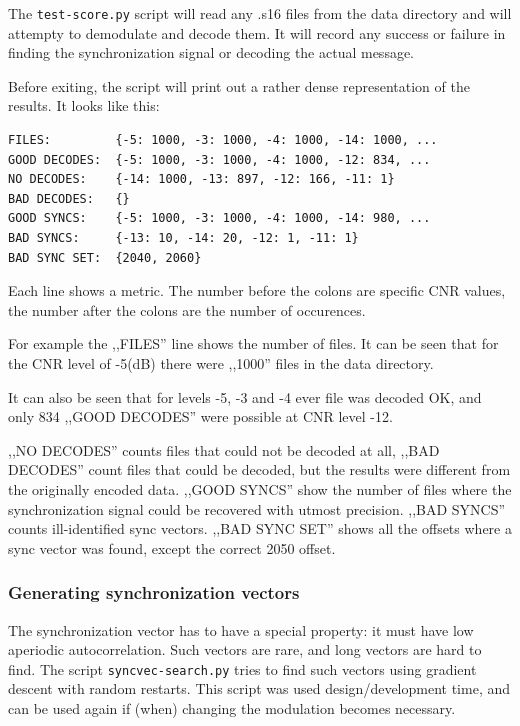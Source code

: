 \documentclass[a4paper]{article}
\begin{document}
The \texttt{test-score.py} script will read any .s16 files from the 
data directory and will attempty to demodulate and decode them. It will 
record any success or failure in finding the synchronization signal or 
decoding the actual message.

Before exiting, the script will print out a rather dense representation 
of the results. It looks like this:

\begin{lstlisting}
FILES:         {-5: 1000, -3: 1000, -4: 1000, -14: 1000, ...
GOOD DECODES:  {-5: 1000, -3: 1000, -4: 1000, -12: 834, ...
NO DECODES:    {-14: 1000, -13: 897, -12: 166, -11: 1}
BAD DECODES:   {}
GOOD SYNCS:    {-5: 1000, -3: 1000, -4: 1000, -14: 980, ...
BAD SYNCS:     {-13: 10, -14: 20, -12: 1, -11: 1}
BAD SYNC SET:  {2040, 2060}
\end{lstlisting}

Each line shows a metric. The number before the colons are specific CNR 
values, the number after the colons are the number of occurences.

For example the ,,FILES'' line shows the number of files. It can be 
seen that for the CNR level of -5(dB) there were ,,1000'' files in the 
data directory.

It can also be seen that for levels -5, -3 and -4 ever file was decoded 
OK, and only 834 ,,GOOD DECODES'' were possible at CNR level -12.

,,NO DECODES'' counts files that could not be decoded at all, ,,BAD 
DECODES'' count files that could be decoded, but the results were 
different from the originally encoded data. ,,GOOD SYNCS'' show the 
number of files where the synchronization signal could be recovered 
with utmost precision. ,,BAD SYNCS'' counts ill-identified sync 
vectors. ,,BAD SYNC SET'' shows all the offsets where a sync vector was 
found, except the correct 2050 offset.

\subsubsection{Generating synchronization vectors}

The synchronization vector has to have a special property: it must have 
low aperiodic autocorrelation. Such vectors are rare, and long vectors 
are hard to find. The script \texttt{syncvec-search.py} tries to find 
such vectors using gradient descent with random restarts. This script 
was used design/development time, and can be used again if (when) 
changing the modulation becomes necessary.
\end{document}
